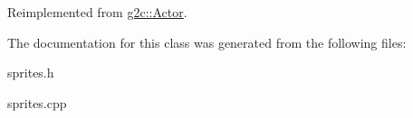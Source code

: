 Reimplemented from \hyperlink{classg2c_1_1_actor_a587aff8d8df73dbba0c659459e094074}{g2c::Actor}.

The documentation for this class was generated from the following files:\begin{DoxyCompactItemize}
\item 
sprites.h\item 
sprites.cpp\end{DoxyCompactItemize}
